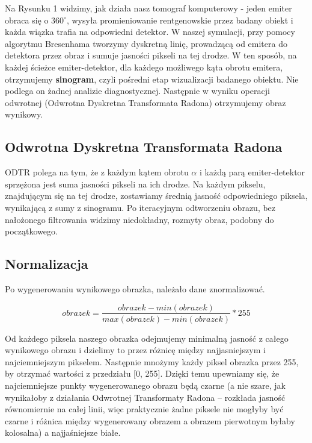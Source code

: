 \documentclass{article}
\begin{document}
Na Rysunku 1 widzimy, jak działa nasz tomograf komputerowy - jeden emiter obraca się o $360 ^{\circ}$, wysyła promieniowanie rentgenowskie przez badany obiekt i każda wiązka trafia na odpowiedni detektor. W naszej symulacji, przy pomocy algorytmu Bresenhama tworzymy dyskretną linię, prowadzącą od emitera do detektora przez obraz i sumuje jasności pikseli na tej drodze. W ten sposób, na każdej ścieżce emiter-detektor, dla każdego możliwego kąta obrotu emitera, otrzymujemy \textbf{sinogram}, czyli pośredni etap wizualizacji badanego obiektu. Nie podlega on żadnej analizie diagnostycznej. Następnie w wyniku operacji odwrotnej (Odwrotna Dyskretna Transformata Radona) otrzymujemy obraz wynikowy. 

\subsection{Odwrotna Dyskretna Transformata Radona
}
ODTR polega na tym, że z każdym kątem obrotu $\alpha$ i każdą parą emiter-detektor sprzężona jest suma jasności pikseli na ich drodze. Na każdym pikselu, znajdującym się na tej drodze, zostawiamy średnią jasność odpowiedniego piksela, wynikającą z sumy z sinogramu. Po iteracyjnym odtworzeniu obrazu, bez nałożonego filtrowania widzimy niedokładny, rozmyty obraz, podobny do początkowego. 

\subsection{Normalizacja}

Po wygenerowaniu wynikowego obrazka, należało dane znormalizować. 

\begin{equation}
obrazek = \frac{obrazek - min(obrazek)}{max(obrazek)-min(obrazek)} * 255
\end{equation}

Od każdego piksela naszego obrazka odejmujemy minimalną jasność z całego wynikowego obrazu i dzielimy to przez różnicę między najjasniejszym i najciemniejszym pikselem. Następnie mnożymy każdy piksel obrazka przez 255, by otrzymać wartości z przedziału [0, 255]. Dzięki temu upewniamy się, że najciemniejsze punkty wygenerowanego obrazu będą czarne (a nie szare, jak wynikałoby z działania Odwrotnej Transformaty Radona -- rozkłada jasność równomiernie na całej linii, więc praktycznie żadne piksele nie mogłyby być czarne i różnica między wygenerowany obrazem a obrazem pierwotnym byłaby kolosalna) a najjaśniejsze białe.
\end{document}
